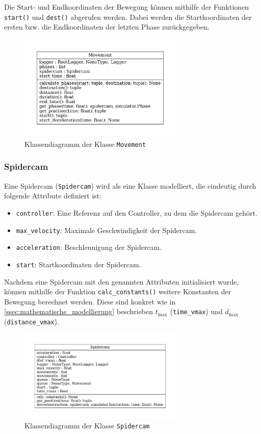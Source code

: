 Die Start- und Endkoordinaten der Bewegung können mithilfe der Funktionen \texttt{start()} und \texttt{dest()} abgerufen werden.
Dabei werden die Startkoordinaten der ersten bzw. die Endkoordinaten der letzten Phase zurückgegeben.

\begin{figure}[H]
    \centering
    \includegraphics[width=0.7\textwidth]{../python/uml/movement.pdf}
    \caption{Klassendiagramm der Klasse \texttt{Movement}}
    \label{fig:movement}
\end{figure}

\subsubsection{Spidercam}
\label{sssec:spidercam}

Eine Spidercam (\texttt{Spidercam}) wird als eine Klasse modelliert, die eindeutig durch folgende Attribute definiert ist:
\begin{itemize}
    \item \texttt{controller}: Eine Referenz auf den Controller, zu dem die Spidercam gehört.
    \item \texttt{max\_velocity}: Maximale Geschwindigkeit der Spidercam.
    \item \texttt{acceleration}: Beschleunigung der Spidercam.
    \item \texttt{start}: Startkoordinaten der Spidercam.
\end{itemize}

Nachdem eine Spidercam mit den genannten Attributen initialisiert wurde, können mithilfe der Funktion \texttt{calc\_constants()} weitere Konstanten der Bewegung berechnet werden.
Diese sind konkret wie in \ref{ssec:mathematische_modellierung} beschrieben $t_{\max}$ (\texttt{time\_vmax}) und $d_{\max}$ (\texttt{distance\_vmax}).

\begin{figure}[H]
    \centering
    \includegraphics[width=0.7\textwidth]{../python/uml/spidercam.pdf}
    \caption{Klassendiagramm der Klasse \texttt{Spidercam}}
    \label{fig:spidercam}
\end{figure}

